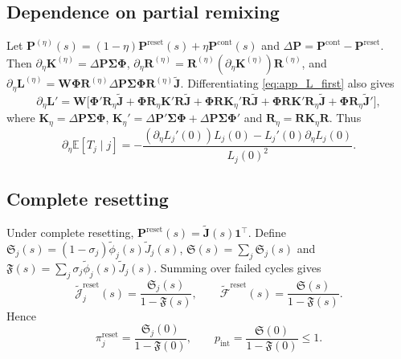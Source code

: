\documentclass[pdflatex,sn-mathphys-num]{sn-jnl}
\numberwithin{equation}{section}
\theoremstyle{thmstyleone}%
\theoremstyle{definition}
\theoremstyle{remark}
\begin{document}
\begin{appendices}
\subsection{Dependence on partial remixing}

Let
$\mathbf P^{(\eta)}(s)=(1-\eta)\mathbf P^{\mathrm{reset}}(s)
+\eta\mathbf P^{\mathrm{cont}}(s)$ and
$\Delta\mathbf P=\mathbf P^{\mathrm{cont}}-\mathbf P^{\mathrm{reset}}$.
Then
$\partial_\eta\mathbf K^{(\eta)}=\Delta\mathbf P\bm\Sigma\bm\Phi$,
$\partial_\eta\mathbf R^{(\eta)}=\mathbf R^{(\eta)}(\partial_\eta\mathbf K^{(\eta)})
\mathbf R^{(\eta)}$, and
$\partial_\eta\mathbf L^{(\eta)}
=\bm W\bm\Phi\mathbf R^{(\eta)}\Delta\mathbf P\bm\Sigma\bm\Phi
\mathbf R^{(\eta)}\widetilde{\mathbf J}$.
Differentiating \eqref{eq:app_L_first} also gives
\begin{equation*}
\partial_\eta\mathbf L'
=\bm W\bigl[\bm\Phi'\mathbf R_\eta\widetilde{\mathbf J}
+\bm\Phi\mathbf R_\eta\mathbf K'\mathbf R\widetilde{\mathbf J}
+\bm\Phi\mathbf R\mathbf K_\eta'\mathbf R\widetilde{\mathbf J}
+\bm\Phi\mathbf R\mathbf K'\mathbf R_\eta\widetilde{\mathbf J}
+\bm\Phi\mathbf R_\eta\widetilde{\mathbf J}'\bigr],
\end{equation*}
where
$\mathbf K_\eta=\Delta\mathbf P\bm\Sigma\bm\Phi$,
$\mathbf K_\eta'=\Delta\mathbf P'\bm\Sigma\bm\Phi
+\Delta\mathbf P\bm\Sigma\bm\Phi'$
and $\mathbf R_\eta=\mathbf R\mathbf K_\eta\mathbf R$.
Thus
\begin{equation}
\partial_\eta\mathbb E[T_j\mid j]
=-\frac{(\partial_\eta L_j'(0))L_j(0)
-L_j'(0)\partial_\eta L_j(0)}{L_j(0)^2}.
\label{eq:app_eta_mean}
\end{equation}

\subsection{Complete resetting}

Under complete resetting,
$\mathbf P^{\mathrm{reset}}(s)=\widetilde{\mathbf J}(s)\mathbf1^\top$.
Define
$\mathfrak S_j(s)=(1-\sigma_j)\widetilde\phi_j(s)\widetilde J_j(s)$,
$\mathfrak S(s)=\sum_j\mathfrak S_j(s)$ and
$\mathfrak F(s)=\sum_j\sigma_j\widetilde\phi_j(s)\widetilde J_j(s)$.
Summing over failed cycles gives
\[
\widetilde{\mathcal J}^{\mathrm{reset}}_j(s)
=\frac{\mathfrak S_j(s)}{1-\mathfrak F(s)},\qquad
\widetilde{\mathcal F}^{\mathrm{reset}}(s)
=\frac{\mathfrak S(s)}{1-\mathfrak F(s)}.
\]
Hence
\[
\pi_j^{\mathrm{reset}}=\frac{\mathfrak S_j(0)}{1-\mathfrak F(0)},
\qquad
p_{\mathrm{int}}=\frac{\mathfrak S(0)}{1-\mathfrak F(0)}\leq1.
\]


\end{appendices}
\end{document}
